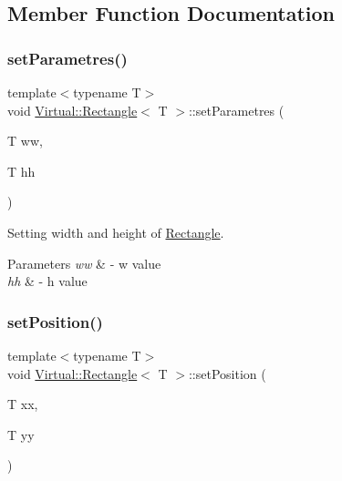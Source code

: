 \subsection{Member Function Documentation}
\hypertarget{struct_virtual_1_1_rectangle_a7894397b7dc0a3ef61b5dfd26e40dcfa}{}\label{struct_virtual_1_1_rectangle_a7894397b7dc0a3ef61b5dfd26e40dcfa} 
\subsubsection{\texorpdfstring{set\+Parametres()}{setParametres()}}
{\footnotesize\ttfamily template$<$typename T$>$ \\
void \hyperlink{struct_virtual_1_1_rectangle}{Virtual\+::\+Rectangle}$<$ T $>$\+::set\+Parametres (\begin{DoxyParamCaption}\item[{T}]{ww,  }\item[{T}]{hh }\end{DoxyParamCaption})\hspace{0.3cm}{\ttfamily [inline]}}



Setting width and height of \hyperlink{struct_virtual_1_1_rectangle}{Rectangle}. 


\begin{DoxyParams}{Parameters}
{\em ww} & -\/ w value \\
\hline
{\em hh} & -\/ h value \\
\hline
\end{DoxyParams}
\hypertarget{struct_virtual_1_1_rectangle_abe71777391c0d70a523bde7be00054df}{}\label{struct_virtual_1_1_rectangle_abe71777391c0d70a523bde7be00054df} 
\subsubsection{\texorpdfstring{set\+Position()}{setPosition()}}
{\footnotesize\ttfamily template$<$typename T$>$ \\
void \hyperlink{struct_virtual_1_1_rectangle}{Virtual\+::\+Rectangle}$<$ T $>$\+::set\+Position (\begin{DoxyParamCaption}\item[{T}]{xx,  }\item[{T}]{yy }\end{DoxyParamCaption})\hspace{0.3cm}{\ttfamily [inline]}}




